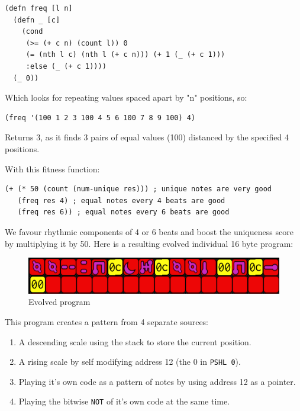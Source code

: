 \documentclass[letterpaper, 12pt]{article}
\begin{document}
\begin{Verbatim}[fontfamily=courier, xleftmargin=\parindent]
(defn freq [l n]
  (defn _ [c]
    (cond
     (>= (+ c n) (count l)) 0
     (= (nth l c) (nth l (+ c n))) (+ 1 (_ (+ c 1)))
     :else (_ (+ c 1))))
  (_ 0))
\end{Verbatim}

Which looks for repeating values spaced apart by "n" positions, so:

\begin{Verbatim}[fontfamily=courier, xleftmargin=\parindent]
(freq '(100 1 2 3 100 4 5 6 100 7 8 9 100) 4) 
\end{Verbatim}

Returns 3, as it finds 3 pairs of equal values (100) distanced by the specified 4 positions.

With this fitness function:

\begin{Verbatim}[fontfamily=courier, xleftmargin=\parindent]
(+ (* 50 (count (num-unique res))) ; unique notes are very good
   (freq res 4) ; equal notes every 4 beats are good
   (freq res 6)) ; equal notes every 6 beats are good
\end{Verbatim}

We favour rhythmic components of 4 or 6 beats and boost the uniqueness score by multiplying it by 50. Here is a resulting evolved individual 16 byte program:

\begin{figure}
	\centering
		\includegraphics[width=13cm]{evolved}
	\caption{Evolved program}
	\label{fig:evolved}
\end{figure}

This program creates a pattern from 4 separate sources:

\begin{enumerate}
\item A descending scale using the stack to store the current position.
\item A rising scale by self modifying address 12 (the 0 in \texttt{PSHL 0}).
\item Playing it's own code as a pattern of notes by using address 12 as a pointer.
\item Playing the bitwise \texttt{NOT} of it's own code at the same time.
\end{enumerate}
\end{document}
